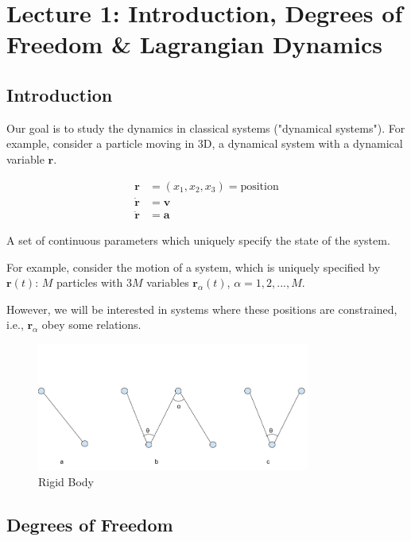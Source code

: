 \setcounter{section}{0}

\section{Lecture 1: Introduction, Degrees of Freedom \& Lagrangian Dynamics}

\subsection{Introduction}

Our goal is to study the dynamics in classical systems ("dynamical systems"). For example, consider a particle moving in 3D, a dynamical system with a dynamical variable $\mathbf{r}$.

\begin{align*}
    \mathbf{r} &= (x_1, x_2, x_3) = \text{position} \\
    \dot{\mathbf{r}} &= \mathbf{v} \\
    \ddot{\mathbf{r}} &= \mathbf{a} 
\end{align*}

\begin{definition}
    A set of continuous parameters which uniquely specify the state of the system.
\end{definition}

For example, consider the motion of a system, which is uniquely specified by $\mathbf{r}(t)$: $M$ particles with $3M$ variables $\mathbf{r}_\alpha(t)$, $\alpha=1,2,...,M$.

However, we will be interested in systems where these positions are constrained, i.e., $\mathbf{r}_\alpha$ obey some relations.

\begin{figure}[ht]
  \centering
  \includegraphics[width=0.8\textwidth]{images/1-1-1.png}
  \caption{Rigid Body}
  \label{fig:1-1-1}
\end{figure}

\subsection{Degrees of Freedom}

